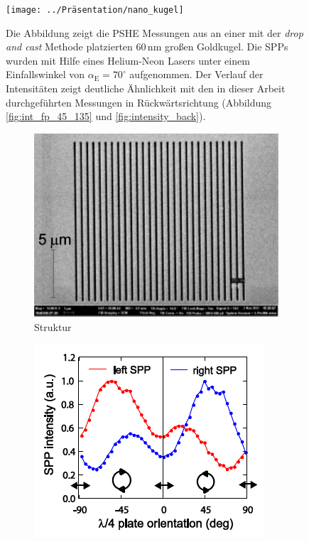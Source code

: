 \documentclass[titlepage,  ngerman]{article}
\begin{document}
	\begin{figure}[h]
		\centering
		\texttt{[image: ../Präsentation/nano\_kugel]}
		\caption[PSHE Messung von \cite{OConnor.2014}]{Die Abbildung zeigt die PSHE Messungen aus \cite{OConnor.2014} an einer mit der \textit{drop and cast} Methode platzierten $60\,\mathrm{nm}$ großen Goldkugel. Die SPPs wurden mit Hilfe eines Helium-Neon Lasers unter einem Einfallswinkel von $\alpha_{\mathrm{E}} = 70^\circ$ aufgenommen. Der Verlauf der Intensitäten zeigt deutliche Ähnlichkeit mit den in dieser Arbeit durchgeführten Messungen in Rückwärtsrichtung (Abbildung \ref{fig:int_fp_45_135} und \ref{fig:intensity_back}).}
		\label{fig:measure_connor}
	\end{figure}
	\begin{figure}[h]		
		\centering
		\begin{subfigure}{0.5\textwidth}
			\centering
			\includegraphics[width=\textwidth]{figures/RF_SM_Slits.pdf}
			\caption{Struktur}
			\label{fig:RF_measure_slits}
		\end{subfigure}
		\hfill
		\begin{subfigure}{0.49\textwidth}
			\centering
			\includegraphics[width=\textwidth]{figures/RF_SM_Intensity.pdf}

\end{subfigure}
\end{figure}
\end{document}
